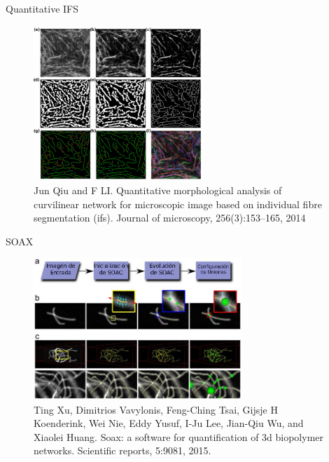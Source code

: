 \documentclass[]{beamer}
\begin{document}
\begin{frame}{Quantitative IFS}
    \begin{figure}[h]
        \centering
        \includegraphics[height=2.3in]{Pictures/QuantitativeIFS.png}
        \caption{Jun Qiu and F LI. Quantitative morphological analysis of curvilinear network for microscopic image based on individual fibre segmentation (ifs). Journal of microscopy, 256(3):153–165, 2014}
    \end{figure}
\end{frame}

\begin{frame}{SOAX}
    \begin{figure}
        \centering
        \includegraphics[height=2.1in]{Pictures/SOAX_translated.jpg}
        \caption{Ting Xu, Dimitrios Vavylonis, Feng-Ching Tsai, Gijsje H Koenderink, Wei Nie, Eddy Yusuf, I-Ju Lee, Jian-Qiu Wu, and Xiaolei Huang. Soax: a software for quantification of 3d biopolymer networks. Scientific reports, 5:9081, 2015.}
    \end{figure}
\end{frame}
\end{document}
